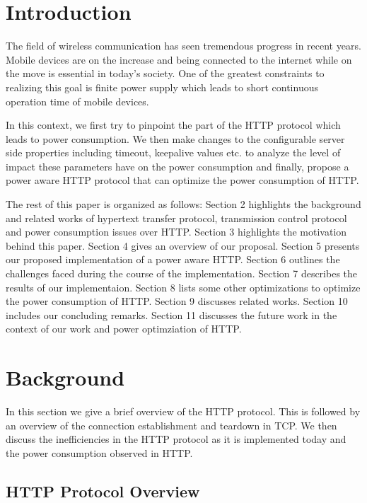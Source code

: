 \documentclass{sigplanconf}
\begin{document}
\section{Introduction}

The field of wireless communication has seen tremendous progress in recent years. Mobile devices are on the increase and being connected to the internet while on the move is essential in today’s society. One of the greatest constraints to realizing this goal is finite power supply which leads to short continuous operation time of mobile devices.

In this context, we first try to pinpoint the part of the HTTP protocol which leads to power consumption. We then make changes to the configurable server side properties including timeout, keepalive values etc. to analyze the level of impact these parameters have on the power consumption and finally, propose a power aware HTTP protocol that can optimize the power consumption of HTTP.

The rest of this paper is organized as follows: Section 2 highlights the background and related works of hypertext transfer protocol, transmission control protocol and power consumption issues over HTTP. Section 3 highlights the motivation behind this paper. Section 4 gives an overview of our proposal. Section 5 presents our proposed implementation of a power aware HTTP. Section 6 outlines the challenges faced during the course of the implementation. Section 7 describes the results of our implementaion. Section 8 lists some other optimizations to optimize the power consumption of HTTP. Section 9 discusses related works. Section 10 includes our concluding remarks. Section 11 discusses the future work in the context of our work and power optimziation of HTTP.

\section{Background}

In this section we give a brief overview of the HTTP protocol. This is followed by an overview of the connection establishment and teardown in TCP. We then discuss the inefficiencies in the HTTP protocol as it is implemented today and the power consumption observed in HTTP.

\subsection{HTTP Protocol Overview}
\end{document}
